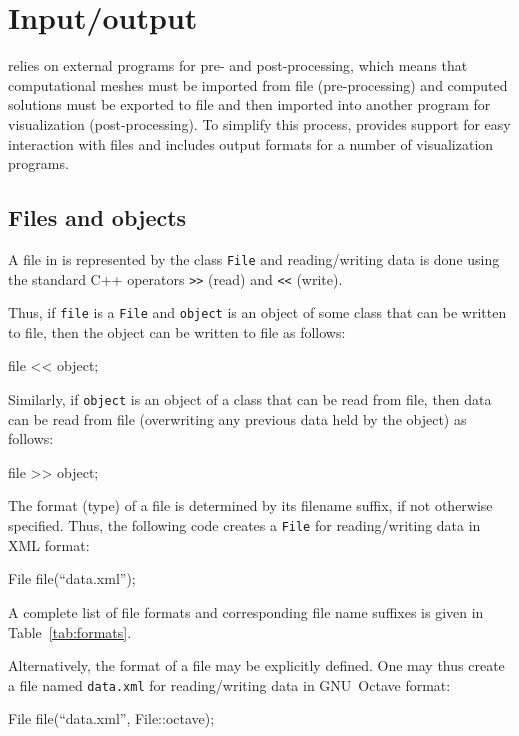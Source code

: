 \chapter{Input/output}

\dolfin{} relies on external programs for pre- and post-processing,
which means that computational meshes must be imported from file
(pre-processing) and computed solutions must be exported to file and
then imported into another program for visualization
(post-processing). To simplify this process, \dolfin{} provides
support for easy interaction with files and includes output formats
for a number of visualization programs.

\section{Files and objects}

A file in \dolfin{} is represented by the class \texttt{File} and
reading/writing data is done using the standard C++ operators
\texttt{>>} (read) and \texttt{<<} (write).

Thus, if \texttt{file} is a \texttt{File} and \texttt{object} is an
object of some class that can be written to file, then the object can
be written to file as follows:
\begin{code}
  file << object;
\end{code}
Similarly, if \texttt{object} is an object of a class that can be read
from file, then data can be read from file (overwriting any previous
data held by the object) as follows:
\begin{code}
  file >> object;
\end{code}

The format (type) of a file is determined by its filename suffix, if
not otherwise specified. Thus, the following code creates a
\texttt{File} for reading/writing data in \dolfin{} XML format:
\begin{code}
  File file(``data.xml'');
\end{code}
A complete list of file formats and corresponding file name suffixes
is given in Table~\ref{tab:formats}.

Alternatively, the format of a file may be explicitly defined. One may
thus create a file named \texttt{data.xml} for reading/writing data in
GNU~Octave format:
\begin{code}
  File file(``data.xml'', File::octave);
\end{code}

